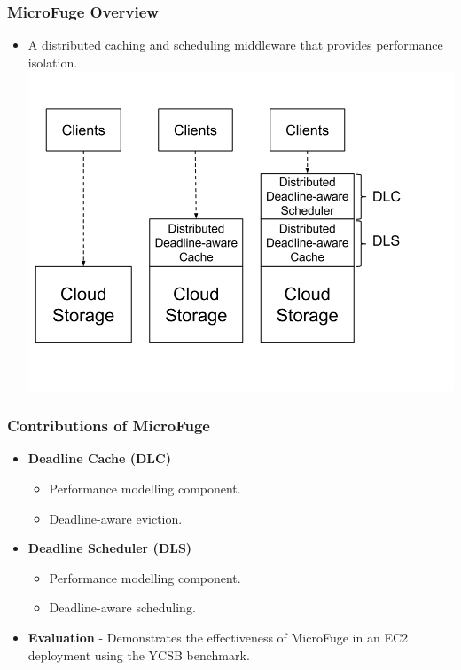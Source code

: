 \documentclass{beamer}
\newcommand{\myv}{\vspace{3 mm}}
\begin{document}
\begin{frame}
  \frametitle{MicroFuge Overview}
  \begin{itemize}
  \item A distributed caching and scheduling middleware that provides
    performance isolation.
  \includegraphics[scale=0.28]{img/MF_FULL.png}
  \end{itemize}
\end{frame}





\begin{frame}
  \frametitle{Contributions of MicroFuge}
  \vspace{-10 mm}
  \begin{itemize}
  \item \textbf{Deadline Cache (DLC)}
    \myv
    \begin{itemize}
      \item Performance modelling component.
      \item Deadline-aware eviction.
    \end{itemize}
    \myv
  \item \textbf{Deadline Scheduler (DLS)}
    \myv
    \begin{itemize}
      \item Performance modelling component.
      \item Deadline-aware scheduling.
    \end{itemize}
    \myv
  \item \textbf{Evaluation} - Demonstrates the effectiveness of MicroFuge in
    an EC2 deployment using the YCSB benchmark.
  \end{itemize}
\end {frame}
\end{document}
